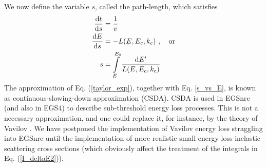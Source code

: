 We now define the variable $s$, called the path-length, 
which satisfies
\begin{equation}
\label{s_vs_E}
\begin{split}
{{\rm d} t \over {\rm d} s} & = \frac{1}{v} \\ 
{{\rm d} E \over {\rm d} s} & = -L(E,E_c,k_c)~, \quad \text{or} \\
 s & = \int\limits_E^{E_0} {{\rm d} E' \over L(E,E_c,k_c)}  
\end{split}
\end{equation}
The approximation of Eq. (\ref{taylor_exp}), together 
with Eq. \eqref{s_vs_E}, is known 
as continuous-slowing-down approximation (CSDA). CSDA is used 
in EGSnrc (and also in EGS4) to describe sub-threshold 
energy loss processes. This is not a necessary 
approximation, and one could replace it, for instance, by 
the theory of Vavilov \cite{Va57}. We have postponed 
the implementation of Vavilov energy loss straggling 
into EGSnrc until the implementation of more realistic 
small energy loss inelastic scattering cross sections 
(which obviously affect the treatment of the integrals in 
Eq. (\ref{I_deltaE2})). 

